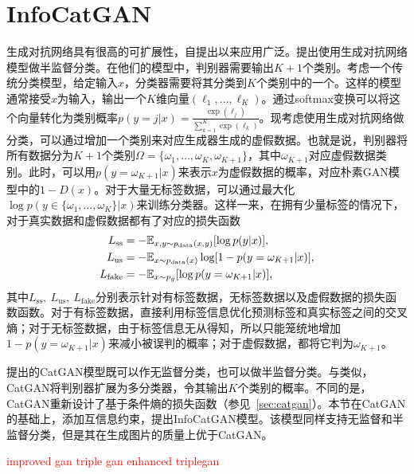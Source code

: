 \section{InfoCatGAN}\label{sec:icg}
生成对抗网络具有很高的可扩展性，自提出以来应用广泛。\citet{salimans2016improved,odena2016semi}提出使用生成对抗网络模型做半监督分类。在他们的模型中，判别器需要输出$K+1$个类别。考虑一个传统分类模型，给定输入$x$，分类器需要将其分类到$K$个类别中的一个。这样的模型通常接受$x$为输入，输出一个$K$维向量$(\ell_1, \dots, \ell_K)$。通过softmax变换可以将这个向量转化为类别概率$p(y=j|x) = \frac{\exp(\ell_j)}{\sum_{k=1}^K \exp(\ell_k)}$。现考虑使用生成对抗网络做分类，可以通过增加一个类别来对应生成器生成的虚假数据。也就是说，判别器将所有数据分为$K+1$个类别$\Omega = \{\omega_1, \dots, \omega_K, \omega_{K+1}\}$，其中$\omega_{K+1}$对应虚假数据类别。此时，可以用$p(y=\omega_{K+1}|x)$来表示$x$为虚假数据的概率，对应朴素GAN模型中的$1 - D(x)$。对于大量无标签数据，可以通过最大化$\log p(y\in \{\omega_1,\dots,\omega_K\} | x)$来训练分类器。这样一来，在拥有少量标签的情况下，对于真实数据和虚假数据都有了对应的损失函数
\begin{align}
  L_{\text{ss}} &= -\mathbb{E}_{x,y \sim p_{\text{data}}(x,y)}[\log p(y|x)], \\
  L_{\text{us}} &= -\mathbb{E}_{x\sim p_{\text{data}}(x)}\log [1 - p(y=\omega_{K+1} | x)], \\
  L_{\text{fake}} &= -\mathbb{E}_{x\sim p_g}[\log p(y=\omega_{K+1} | x)],
\end{align}
其中$L_{\text{ss}}, ~L_{\text{us}}, ~L_{\text{fake}}$分别表示针对有标签数据，无标签数据以及虚假数据的损失函数函数。对于有标签数据，直接利用标签信息优化预测标签和真实标签之间的交叉熵；对于无标签数据，由于标签信息无从得知，所以只能笼统地增加$1-p(y=\omega_{K+1}|x)$来减小被误判的概率；对于虚假数据，都将它判为$\omega_{K+1}$。

\citet{springenberg2015unsupervised}提出的CatGAN模型既可以作无监督分类，也可以做半监督分类。与\citet{salimans2016improved,odena2016semi}类似，CatGAN将判别器扩展为多分类器，令其输出$K$个类别的概率。不同的是，CatGAN重新设计了基于条件熵的损失函数（参见~\ref{sec:catgan}）。本节在CatGAN的基础上，添加互信息约束，提出InfoCatGAN模型。该模型同样支持无监督和半监督分类，但是其在生成图片的质量上优于CatGAN。

\textcolor{red}{improved gan triple gan enhanced triplegan}


